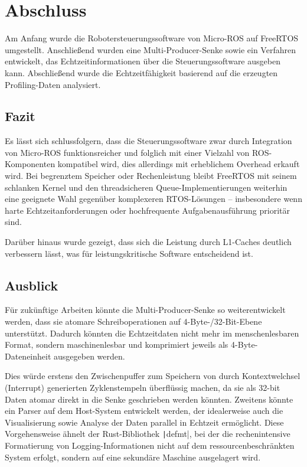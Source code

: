 \section{Abschluss}

Am Anfang wurde die Robotersteuerungssoftware von Micro-ROS auf FreeRTOS
umgestellt. Anschließend wurden eine Multi-Producer-Senke sowie ein Verfahren
entwickelt, das Echtzeitinformationen über die Steuerungssoftware ausgeben kann.
Abschließend wurde die Echtzeitfähigkeit basierend auf die erzeugten
Profiling-Daten analysiert.

\subsection{Fazit}

Es lässt sich schlussfolgern, dass die Steuerungssoftware zwar durch Integration
von Micro-ROS funktionsreicher und folglich mit einer Vielzahl von
ROS-Komponenten kompatibel wird, dies allerdings mit erheblichem Overhead
erkauft wird. Bei begrenztem Speicher oder Rechenleistung bleibt FreeRTOS mit
seinem schlanken Kernel und den threadsicheren Queue-Implementierungen weiterhin
eine geeignete Wahl gegenüber komplexeren RTOS-Lösungen -- insbesondere wenn
harte Echtzeitanforderungen oder hochfrequente Aufgabenausführung prioritär
sind.

Darüber hinaus wurde gezeigt, dass sich die Leistung durch L1-Caches deutlich
verbessern lässt, was für leistungskritische Software entscheidend ist.

\subsection{Ausblick}

Für zukünftige Arbeiten könnte die Multi-Producer-Senke so weiterentwickelt
werden, dass sie atomare Schreiboperationen auf 4-Byte-/32-Bit-Ebene
unterstützt. Dadurch könnten die Echtzeitdaten nicht mehr im menschenlesbaren
Format, sondern maschinenlesbar und komprimiert jeweils als 4-Byte-Dateneinheit
ausgegeben werden.

Dies würde erstens den Zwischenpuffer zum Speichern von durch Kontextwelchsel
(Interrupt) generierten Zyklenstempeln überflüssig machen, da sie als 32-bit
Daten atomar direkt in die Senke geschrieben werden könnten. Zweitens könnte ein
Parser auf dem Host-System entwickelt werden, der idealerweise auch die
Visualisierung sowie Analyse der Daten parallel in Echtzeit ermöglicht. Diese
Vorgehensweise ähnelt der Rust-Bibliothek \texttt|defmt|, bei der die
rechenintensive Formatierung von Logging-Informationen nicht auf dem
ressourcenbeschränkten System erfolgt, sondern auf eine sekundäre Maschine
ausgelagert wird.
